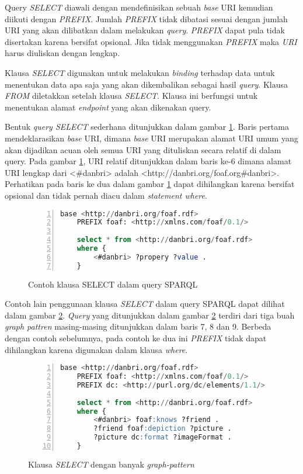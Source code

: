 Query \emph{SELECT} diawali dengan mendefinisikan sebuah \emph{base} URI kemudian diikuti dengan \emph{PREFIX}. Jumlah \emph{PREFIX} tidak dibatasi sesuai dengan jumlah URI yang akan dilibatkan dalam melakukan \emph{query}. \emph{PREFIX} dapat pula tidak disertakan karena bersifat opsional. Jika tidak menggunakan \emph{PREFIX} maka \emph{URI} harus diuliskan dengan lengkap.

Klausa \emph{SELECT} digunakan untuk melakukan \emph{binding} terhadap data untuk menentukan data apa saja yang akan dikembalikan sebagai hasil \emph{query}. Klausa \emph{FROM} diletakkan setelah klausa \emph{SELECT}. Klausa ini berfungsi untuk menentukan alamat \emph{endpoint} yang akan dikenakan query.

Bentuk \emph{query SELECT} sederhana ditunjukkan dalam gambar \ref{fig:sparql_select_1}. Baris pertama mendeklarasikan \emph{base} URI, dimana \emph{base} URI merupakan alamat URI umum yang akan dijadikan acuan oleh semua URI yang dituliskan secara relatif di dalam query. Pada gambar \ref{fig:sparql_select_1}, URI relatif ditunjukkan dalam baris ke-6 dimana alamat URI lengkap dari <\#danbri> adalah <http://danbri.org/foaf.org\#danbri>. Perhatikan pada baris ke dua dalam gambar \ref{fig:sparql_select_1} dapat dihilangkan karena bersifat opsional dan tidak pernah diacu dalam \emph{statement where}.

\begin{figure}[hb]
	\centering
	\begin{lstlisting}[language=SQL, numbers=left]
	base <http://danbri.org/foaf.rdf>
	PREFIX foaf: <http://xmlns.com/foaf/0.1/>

	select * from <http://danbri.org/foaf.rdf>
	where {
		<#danbri> ?propery ?value .
	}\end{lstlisting}
	\caption{Contoh klausa SELECT dalam query SPARQL \citep{liyang_yu}}
	\label{fig:sparql_select_1}
\end{figure}

Contoh lain penggunaan klausa \emph{SELECT} dalam query SPARQL dapat dilihat dalam gambar \ref{fig:sparql_select_2}. \emph{Query} yang ditunjukkan dalam gambar \ref{fig:sparql_select_2} terdiri dari tiga buah \emph{graph pattren} masing-masing ditunjukkan dalam baris 7, 8 dan 9. Berbeda dengan contoh sebelumnya, pada contoh ke dua ini \emph{PREFIX} tidak dapat dihilangkan karena digunakan dalam klausa \emph{where}. 

\begin{figure}[ht]
	\centering
	\begin{lstlisting}[language=SQL,numbers=left]
	base <http://danbri.org/foaf.rdf>
	PREFIX foaf: <http://xmlns.com/foaf/0.1/>
	PREFIX dc: <http://purl.org/dc/elements/1.1/>

	select * from <http://danbri.org/foaf.rdf>
	where {
		<#danbri> foaf:knows ?friend .
		?friend foaf:depiction ?picture .
		?picture dc:format ?imageFormat .
	}\end{lstlisting}
	\caption{Klausa \emph{SELECT} dengan banyak \emph{graph-pattern} \citep{liyang_yu}}
	\label{fig:sparql_select_2}
\end{figure}

